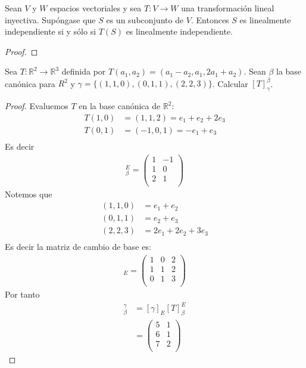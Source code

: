 \documentclass[11pt]{article}
\numberwithin{equation}{section}
\newcommand{\R}{\mathbb{R}}
\begin{document}
\begin{Problema}{} Sean $V$ y $W$ espacios vectoriales y sea $T: V \to W$ una transformación lineal inyectiva. Supóngase que $S$ es un subconjunto de $V$. 
    Entonces $S$ es linealmente independiente si y sólo si $T(S)$ es linealmente independiente.
\end{Problema}
\begin{proof}
    
\end{proof}


\begin{Problema}{} Sea $T: \R^2 \to \R^3$ definida por $T(a_1, a_2) = (a_1 - a_2, a_1, 2a_1 + a_2)$. 
    Sean $\beta$ la base canónica para $R^2$ y $\gamma = \{(1,1,0), (0,1,1), (2,2,3)\}$. 
    Calcular $[T]_{\gamma}^\beta$.
\end{Problema}
\begin{proof}
    Evaluemos $T$ en la base canónica de $\R^2$:
    \begin{align*}
        T(1,0)&=(1,1,2)=e_1+e_2+2e_3\\
        T(0,1)&=(-1,0,1)=-e_1+e_3\\
    \end{align*}
Es decir
\begin{align*}
    [T]_\beta^E=\begin{pmatrix}
        1 & -1 \\
        1 & 0 \\
        2 & 1 \\
    \end{pmatrix}
\end{align*}
Notemos que
\begin{align*}
    (1,1,0)&=e_1+e_2\\
    (0,1,1)&=e_2+e_3\\
    (2,2,3)&=2e_1+2e_2+3e_3\\
\end{align*}
Es decir la matriz de cambio de base es:
\begin{align*}
    [\gamma]_{E}=\begin{pmatrix}
        1 & 0 & 2 \\
        1 & 1 & 2 \\
        0 & 1 & 3 \\
    \end{pmatrix}
\end{align*}
Por tanto 
\begin{align*}
    [T]_\beta^\gamma&=[\gamma]_{E}[T]_\beta^E\\
    &=\begin{pmatrix}
        5 & 1 \\
        6 & 1 \\
        7 & 2 \\
    \end{pmatrix}
\end{align*}
\end{proof}
\end{document}
